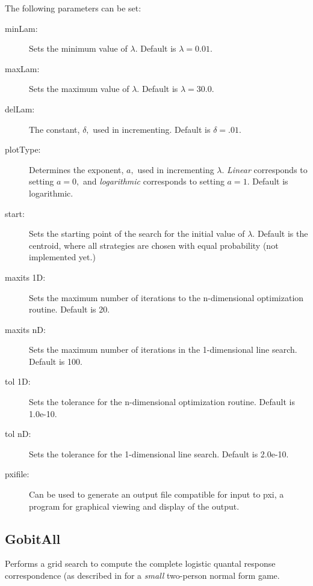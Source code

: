 The following parameters can be set:

\begin{description}
\item[minLam:] Sets the minimum value of $\lambda.$ 
Default is $\lambda = 0.01$.
\item[maxLam:] Sets the maximum value of $\lambda.$  Default is 
$\lambda = 30.0.$
\item[delLam:]  The constant, $\delta,$ used in incrementing.   Default is 
$\delta = .01.$
\item[plotType:] Determines the exponent, $a,$ used in incrementing 
$\lambda.$  {\em Linear} corresponds to setting $a = 0,$ and {\em 
logarithmic} corresponds to setting $a = 1.$ Default is logarithmic.
\item[start:] Sets the starting point of the search for the initial value of 
$\lambda.$  Default is the centroid, where all strategies are chosen 
with equal probability (not implemented yet.)
\item[maxits 1D:] Sets the maximum number of iterations to the 
n-dimensional optimization routine.  Default is 20.
\item[maxits nD:] Sets the maximum number of iterations in the 
1-dimensional line search.  Default is 100.
\item[tol 1D:] Sets the tolerance for the n-dimensional optimization 
routine.  Default is 1.0e-10.
\item[tol nD:] Sets the tolerance for the 1-dimensional line search. 
Default is 2.0e-10.
\item[pxifile:] Can be used to generate an output file compatible for 
input to pxi, a program for graphical viewing and display of the output. 
\end{description}

\subsection{GobitAll}\label{GobitAll}
Performs a grid search to compute the complete logistic
quantal response correspondence (as described in \cite{McKPal:95a}
for a {\em small} two-person normal form game.

